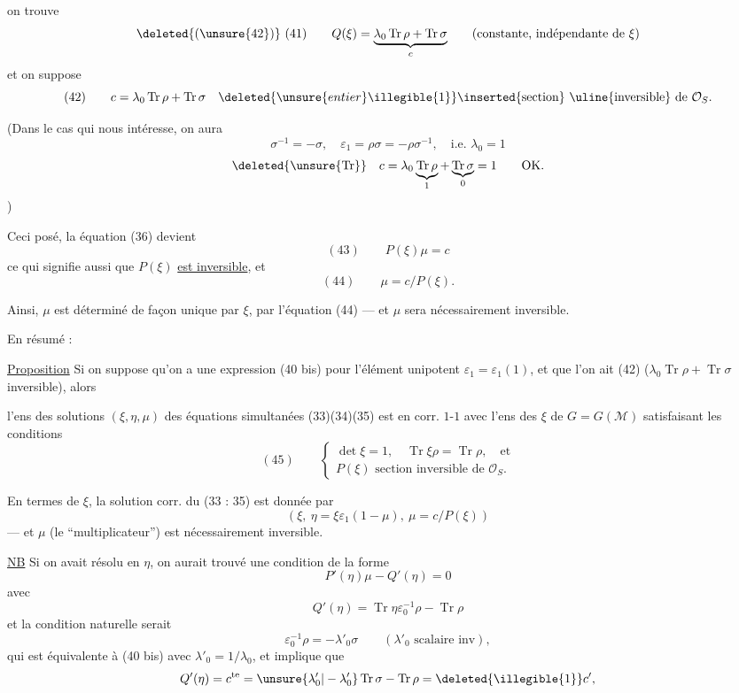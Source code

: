 on trouve
\[
\deleted{(\unsure{42})}\ (41)\qquad
Q(\xi)=\underbrace{\lambda_0\operatorname{Tr}\rho+\operatorname{Tr}\sigma}_{c}
\qquad
(\text{constante, indépendante de }\xi)
\]
et on suppose
\[
(42)\qquad
c=\lambda_0\operatorname{Tr}\rho+\operatorname{Tr}\sigma
\quad
\deleted{\unsure{entier}\illegible{1}}
\inserted{\text{section}}\text{ \uline{inversible} de }\mathcal O_S.
\]

(Dans le cas qui nous intéresse, on aura
\[
\sigma^{-1}=-\sigma,\quad
\varepsilon_1=\rho\sigma=-\rho\sigma^{-1},\quad
\text{i.e. }\lambda_0=1
\]
\[
\deleted{\unsure{\operatorname{Tr}}}\quad
c=\lambda_0\underbrace{\operatorname{Tr}\rho}_{1}
+\underbrace{\operatorname{Tr}\sigma}_{0}=1
\qquad\text{OK.}
\]
)

Ceci posé, la  équation (36) devient
\[
(43)\qquad P(\xi)\mu=c
\]
ce qui signifie aussi que $P(\xi)$ \uline{est inversible}, et
\[
(44)\qquad \mu=c/P(\xi).
\]

Ainsi, $\mu$ est déterminé de façon unique par $\xi$, par l'équation (44) ---
et $\mu$ sera nécessairement inversible.

En résumé :

\uline{Proposition} Si on suppose qu'on a 
une expression (40 bis) pour l'élément unipotent
$\varepsilon_1=\varepsilon_1(1)$, et que l'on ait (42)
($\lambda_0\operatorname{Tr}\rho+\operatorname{Tr}\sigma$ inversible), alors


l'ens des solutions  $(\xi,\eta,\mu)$ des
équations simultanées (33)(34)(35)
est en corr. $1$-$1$ avec l'ens des $\xi$
 de $G=G(\mathcal{M})$
satisfaisant les conditions
\[
(45)\qquad
\left\{
\begin{gathered}
\det\xi=1,\quad \operatorname{Tr}\xi\rho=\operatorname{Tr}\rho,\quad\text{et}\\
P(\xi)\text{ section inversible de }\mathcal O_S.
\end{gathered}
\right.
\]

En termes de $\xi$, la solution corr. du  (33 : 35)
est donnée par
\[
(\xi,\ \eta=\xi\varepsilon_1(1-\mu),\ \mu=c/P(\xi))
\]
--- et $\mu$ (le “multiplicateur”) est nécessairement inversible.

\uline{NB} Si on avait résolu en $\eta$, on aurait
trouvé une condition de la forme
\[
P'(\eta)\mu-Q'(\eta)=0
\]
avec
\[
Q'(\eta)=\operatorname{Tr}\eta\varepsilon_0^{-1}\rho-\operatorname{Tr}\rho
\]
et la condition naturelle serait
\[
\varepsilon_0^{-1}\rho=-\lambda'_0\sigma
\qquad(\lambda'_0\text{ scalaire inv}),
\]
qui est équivalente à (40 bis) avec $\lambda'_0=1/\lambda_0$,
et implique que
\[
Q'(\eta)=c^{\mathrm{te}}
=\unsure{\lambda'_0|-\lambda'_0}\operatorname{Tr}\sigma-\operatorname{Tr}\rho
=\deleted{\illegible{1}}c',
\]

